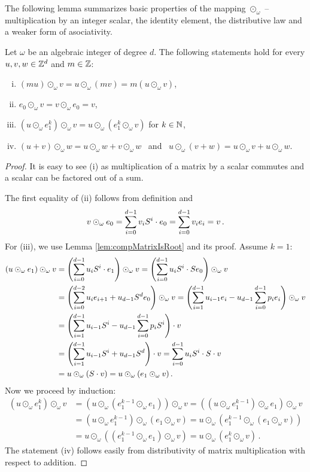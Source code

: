The following lemma summarizes basic properties of the mapping $\odot_\omega$ -- multiplication by an integer scalar, the identity element, the distributive law and a weaker form of asociativity.
\begin{lem}
\label{lem:multInZd}
Let $\omega$ be an algebraic integer of degree $d$. The following statements hold for every $u,v,w\in \mathbb{Z}^d$ and $m\in\mathbb{Z}$:
\begin{enumerate}[(i)]
    \item $(mu)\odot_\omega v = u \odot_\omega (m v)= m (u\odot_\omega v)$,
    \item $e_0 \odot_\omega v= v \odot_\omega e_0 =v$,
    \item $(u \odot_\omega e_1^k)\odot_\omega v = u \odot_\omega (e_1^k\odot_\omega v)$ for $k\in\mathbb{N}$,
    \item $(u+v)\odot_\omega w =u\odot_\omega w + v\odot_\omega w$ \ and \ $u \odot_\omega (v+w)= u \odot_\omega v +u\odot_\omega w$.
\end{enumerate}
\end{lem}
\begin{proof}
It is easy to see (i) as multiplication of a matrix by a scalar commutes and a scalar can be factored out of a sum. 

The first equality of (ii) follows from definition and
$$
v \odot_\omega e_0=\sum_{i=0}^{d-1} {v}_i S^i\cdot e_0= \sum_{i=0}^{d-1} v_i e_i = v\,.
$$
For (iii), we use Lemma \ref{lem:compMatrixIsRoot} and its proof. Assume $k=1$:
\begin{align*}
(u \odot_\omega e_1)\odot_\omega v &= \left(\sum_{i=0}^{d-1} {u}_i S^i \cdot e_1\right) \odot_\omega v = \left(\sum_{i=0}^{d-1} {u}_i S^i \cdot S e_0\right) \odot_\omega v \\
    &=\left(\sum_{i=0}^{d-2}u_i e_{i+1} + u_{d-1} S^d e_{0} \right)\odot_\omega v= \left(\sum_{i=1}^{d-1}u_{i-1} e_{i} - u_{d-1} \sum_{i=0}^{d-1} p_i e_{i} \right)\odot_\omega v \\
    &=\left(\sum_{i=1}^{d-1}u_{i-1}S^i - u_{d-1} \sum_{i=0}^{d-1}p_i S^i \right)\cdot v \\
    &=\left(\sum_{i=1}^{d-1}u_{i-1}S^i  + u_{d-1}S^d\right)\cdot v =\sum_{i=0}^{d-1}u_{i}S^i\cdot S\cdot v \\
    &=u \odot_\omega (S\cdot v)=u \odot_\omega (e_1\odot_\omega v)\,.
\end{align*}
Now we proceed by induction:
\begin{align*}
\left(u \odot_\omega e_1^k\right)\odot_\omega v &=\left(u \odot_\omega (e_1^{k-1}\odot_\omega e_1) \right)\odot_\omega v = \left((u \odot_\omega e_1^{k-1})\odot_\omega e_1 \right)\odot_\omega v \\
    &= (u \odot_\omega e_1^{k-1})\odot_\omega \left(e_1 \odot_\omega v \right)= u \odot_\omega \left( e_1^{k-1}\odot_\omega (e_1 \odot_\omega v )\right)\\
    &= u \odot_\omega \left(( e_1^{k-1}\odot_\omega e_1 )\odot_\omega v \right) = u \odot_\omega \left(e_1^k\odot_\omega v\right)\,.
\end{align*}
The statement (iv) follows easily from distributivity of matrix multiplication with respect to addition. 
\end{proof}




